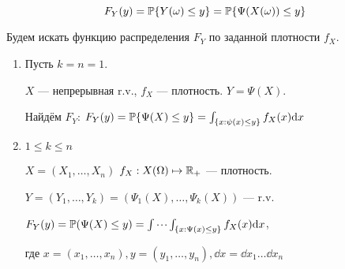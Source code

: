 \[F_Y(y) = \mathbb P \{Y(\omega) \leq y\} = \mathbb P \{ \Psi(X(\omega)) \leq y\}\]

Будем искать функцию распределения \(F_Y\) по заданной плотности
\(f_X\).

\begin{enumerate}
\def\labelenumi{\arabic{enumi}.}
\item
  Пусть \(k=n=1\).

  \(X\) --- непрерывная r.v., \(f_X\) --- плотность. \(Y = \Psi(X)\).

  Найдём \(F_Y\):
  \(F_Y(y) = \mathbb P\{\Psi(X)\leq y\} = \int_{\{x: \psi(x) \leq y\}} f_X(x) \mathrm d x\)
\item
  \(1 \leq k \leq n\)

  \(X = (X_1, \ldots, X_n)\) \(f_X : X(\Omega)\mapsto\mathbb R_+\) ---
  плотность.

  \(Y = (Y_1, \ldots, Y_k) = (\Psi_1(X), \ldots, \Psi_k(X))\) --- r.v.

  \(F_Y(y) = \mathbb P(\Psi(X)\leq y) = \idotsint_{\{ x: \Psi(x) \leq y \}} f_X(x) \mathrm d x\),

  где
  \({x=(x_1, \ldots, x_n)}, {y=(y_1,\ldots,y_n)}, {\dd x = \dd x_1 \ldots \dd x_n}\)
\end{enumerate}
